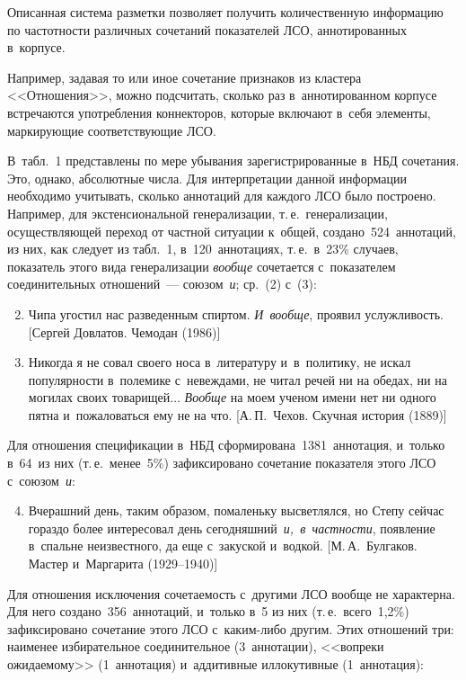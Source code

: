\begin{multicols}{2}

\noindent
  Описанная система разметки позволяет получить количественную 
информацию по час\-тот\-ности  различных сочетаний показателей ЛСО, 
аннотированных в~корпусе. 

Например, задавая то или иное сочетание 
признаков из кластера <<Отношения>>, можно подсчитать, сколько раз 
в~аннотированном корпусе встречаются употребления коннекторов, которые 
включают в~себя элементы, маркирующие соответствующие ЛСО. 

В~табл.~1 
представлены по мере убывания зарегистрированные в~НБД сочетания.
  Это, однако, абсолютные числа. Для интерпретации данной информации 
необходимо учитывать, сколько аннотаций для каждого ЛСО было построено. 
Например, для экстенсиональной генерализации, т.\,е.\ генерализации, 
осуществляющей переход от частной ситуации к~общей, 
создано~524~аннотаций, из них, как следует из табл.~1, в~120~аннотациях, 
т.\,е.\ в~23\% случаев, показатель этого вида генерализации \textit{вообще} 
сочетается с~показателем соединительных отношений~--- союзом~\textit{и}; 
ср.~(2) с~(3):
{

}
  \begin{enumerate}[(1)]
  \setcounter{enumi}{1}
\item Чипа угостил нас разведенным спиртом. \textit{И~вообще}, проявил 
услужливость. [Сергей Довлатов. Чемодан (1986)]
\item Никогда я не совал своего носа в~литературу и~в~политику, не искал 
популярности в~полемике с~невеждами, не читал речей ни на обедах, ни на 
могилах своих товарищей$\ldots$ \textit{Вообще} на моем ученом имени 
нет ни одного пятна и~пожаловаться ему не на что. [А.\,П.~Чехов. Скучная 
история (1889)]
\end{enumerate}

  Для отношения спецификации в~НБД сформирована~1381~аннотация, 
и~только в~64~из них (т.\,е.\ менее~5\%) зафиксировано сочетание показателя 
этого ЛСО с~союзом~\textit{и}: 
  \begin{enumerate}[(1)]
  \setcounter{enumi}{3}
  \item Вчерашний день, таким образом, помаленьку высветлялся, но Степу 
сейчас гораздо более интересовал день сегодняшний~\textit{и,~в~част\-ности}, 
появление в~спальне неизвестного, да еще с~закуской и~водкой. 
[М.\,А.~Булгаков. Мастер и~Маргарита (1929--1940)]
  \end{enumerate}
  
  Для отношения исключения сочетаемость с~другими ЛСО вообще не 
характерна. Для него создано~356~аннотаций, и~только в~5 из них (т.\,е.\ 
всего~1,2\%) зафиксировано сочетание этого ЛСО с~ка\-ким-ли\-бо другим. 
Этих отношений три: наименее избирательное соединительное (3~аннотации), 
<<вопреки ожидаемому>> (1~аннотация) и~аддитивные иллокутивные 
(1~аннотация):
  \begin{enumerate}[(1)]
  \setcounter{enumi}{4}
  

\end{enumerate}
\end{multicols}
